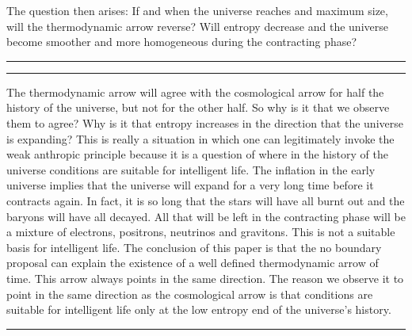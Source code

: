 \begin{enumerate}
The question then arises: If and when the universe reaches and maximum size, will the thermodynamic arrow reverse? Will entropy decrease and the universe become smoother and more homogeneous during the contracting phase?
\bigskip
\hrule
{}
\bigskip
\hrule
\bigskip
The thermodynamic arrow will agree with the cosmological arrow for half the history of the universe, but not for the other half. So why is it that we observe them to agree? Why is it that entropy increases in the direction that the universe is expanding? This is really a situation in which one can legitimately invoke the weak anthropic principle because it is a question of where in the history of the universe conditions are suitable for intelligent life. The inflation in the early universe implies that the universe will expand for a very long time before it contracts again. In fact, it is so long that the stars will have all burnt out and the baryons will have all decayed. All that will be left in the contracting phase will be a mixture of electrons, positrons, neutrinos and gravitons. This is not a suitable basis for intelligent life.
The conclusion of this paper is that the no boundary proposal can explain the existence of a well defined thermodynamic arrow of time. This arrow always points in the same direction. The reason we observe it to point in the same direction as the cosmological arrow is that conditions are suitable for intelligent life only at the low entropy end of the universe's history.
\bigskip
\hrule
\bigskip
\end{enumerate}

